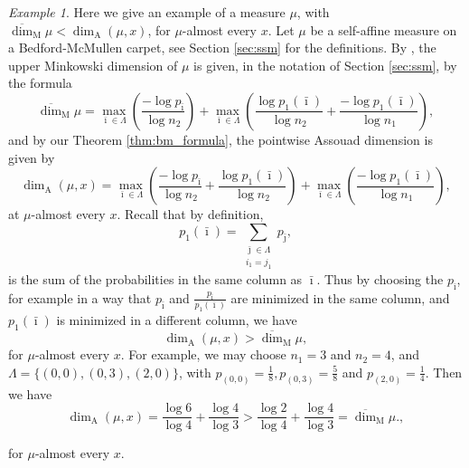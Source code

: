\documentclass{PRM}
\newcommand{\updim}{\overline{\dim}}
\newcommand{\adim}{\dim_{\mathrm{A}}}
\theoremstyle{plain}
\theoremstyle{definition}
\theoremstyle{remark}
\newtheorem{example}[thm]{Example}
\begin{document}
\begin{example}
Here we give an example of a measure $\mu$, with $\updim_{\mathrm{M}}\mu<\adim(\mu,x)$, for $\mu$-almost every $x$. Let $\mu$ be a self-affine measure on a Bedford-McMullen carpet, see Section \ref{sec:ssm} for the definitions. By \cite[Theorem 8.6.2]{F}, the upper Minkowski dimension of $\mu$ is given, in the notation of Section \ref{sec:ssm}, by the formula
\begin{equation*}
    \updim_{\mathrm{M}}\mu=\max_{\bar{\imath}\in\Lambda}\left(\frac{-\log p_{\bar{\imath}}}{\log n_2}\right)+\max_{\bar{\imath}\in\Lambda}\left(\frac{\log p_1(\bar{\imath})}{\log n_2}+\frac{-\log p_1(\bar{\imath})}{\log n_1}\right),
\end{equation*}
and by our Theorem \ref{thm:bm_formula}, the pointwise Assouad dimension is given by
\begin{equation*}
    \adim(\mu,x)=\max_{\bar{\imath}\in\Lambda}\left(\frac{-\log p_{\bar{\imath}}}{\log n_2}+\frac{\log p_1(\bar{\imath})}{\log n_2}\right)+\max_{\bar{\imath}\in\Lambda}\left(\frac{-\log p_1(\bar{\imath})}{\log n_1}\right),
\end{equation*}
at $\mu$-almost every $x$. Recall that by definition,
\begin{equation*}
    p_1(\bar{\imath})=\sum_{\substack{\bar{\jmath}\in\Lambda \\i_1=j_1}}p_{\bar{\jmath}},
\end{equation*}
is the sum of the probabilities in the same column as $\bar{\imath}$. Thus by choosing the $p_{\bar{\imath}}$, for example in a way that $p_{\bar{\imath}}$ and $\frac{p_{\bar{\imath}}}{p_1(\bar{\imath})}$ are minimized in the same column, and $p_1(\bar{\imath})$ is minimized in a different column, we have
\begin{equation*}
    \adim(\mu,x)>\updim_{\mathrm{M}}\mu,
\end{equation*}
for $\mu$-almost every $x$. For example, we may choose $n_1=3$ and $n_2=4$, and $\Lambda=\{(0,0),(0,3),(2,0)\}$, with $p_{(0,0)}=\frac{1}{8},p_{(0,3)}=\frac{5}{8}$ and $p_{(2,0)}=\frac{1}{4}$. Then we have
\begin{equation*}
    \adim(\mu,x)=\frac{\log 6}{\log 4}+\frac{\log 4}{\log 3}> \frac{\log2}{\log 4}+\frac{\log 4}{\log 3}=\updim_{\mathrm{M}}\mu.,\end{equation*}
\end{example}
for $\mu$-almost every $x$.


            
\end{document}
